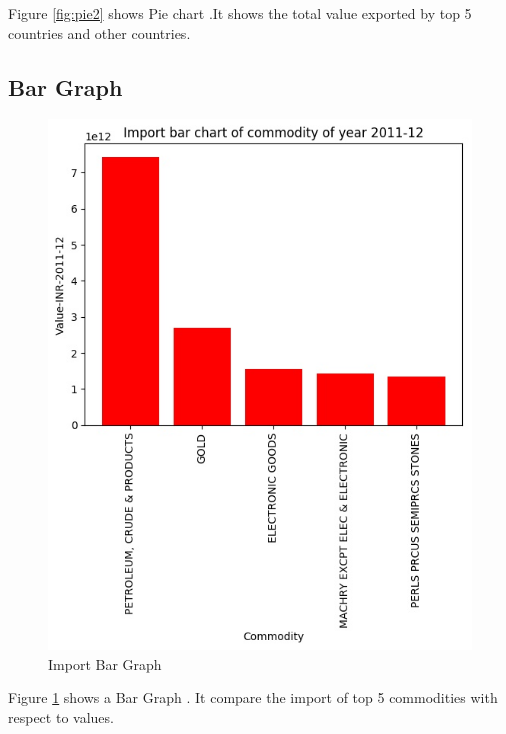 \documentclass[a4paper,11pt]{article}
\begin{document}
Figure \ref{fig:pie2} shows Pie chart .It shows the total value exported by top 5 countries and other countries.


\subsection{Bar Graph}
\begin{figure}[H]
\centering
\includegraphics[scale=0.70,width=\textwidth]{image3.jpg}
  \caption{Import Bar Graph}
  \label{fig:bar1}
  
\end{figure}

Figure \ref{fig:bar1} shows a Bar Graph . It compare the import of top 5  commodities with respect to values.
\end{document}
